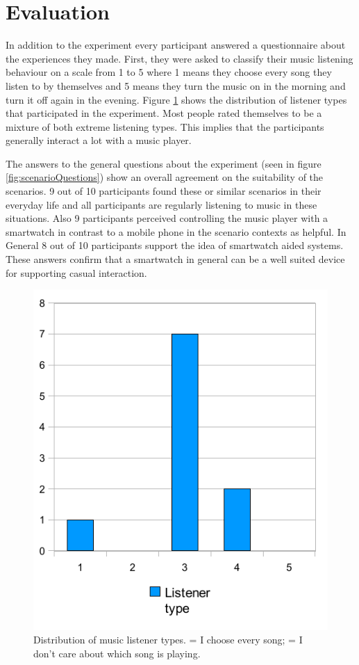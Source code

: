 \section{Evaluation}\label{sec:studyResults}
In addition to the experiment every participant answered a questionnaire about the experiences they made. First, they were asked to classify their music listening behaviour on a scale from 1 to 5 where 1 means they choose every song they listen to by themselves and 5 means they turn the music on in the morning and turn it off again in the evening. Figure \ref{fig:listenerTypes} shows the distribution of listener types that participated in the experiment. Most people rated themselves to be a mixture of both extreme listening types. This implies that the participants generally interact a lot with a music player.

The answers to the general questions about the experiment (seen in figure \ref{fig:scenarioQuestions}) show an overall agreement on the suitability of the scenarios. 9 out of 10 participants found these or similar scenarios in their everyday life and all participants are regularly listening to music in these situations. Also 9 participants perceived controlling the music player with a smartwatch in contrast to a mobile phone in the scenario contexts as helpful. In General 8 out of 10 participants support the idea of smartwatch aided systems. These answers confirm that a smartwatch in general can be a well suited device for supporting casual interaction.

\begin{figure}[h]
	\myfloatalign
	\includegraphics[width=.6\linewidth]{img/listenerTypesPlot.pdf}
	\caption{Distribution of music listener types.  = I choose every song;  = I don't care about which song is playing.}
	\label{fig:listenerTypes}
\end{figure}

